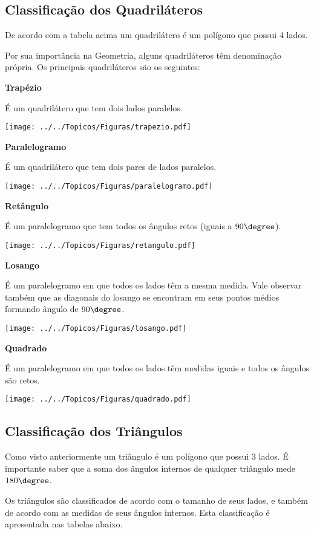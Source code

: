 \subsection{Classificação dos Quadriláteros}

De acordo com a tabela acima um quadrilátero é um polígono que possui 4 lados.

Por sua importância na Geometria, alguns quadriláteros têm denominação própria. Os principais quadriláteros são os seguintes:

\textbf{Trapézio}

É um quadrilátero que tem dois lados paralelos. 

\texttt{[image: ../../Topicos/Figuras/trapezio.pdf]}


\textbf{Paralelogramo}

É um quadrilátero que tem dois pares de lados paralelos.

\texttt{[image: ../../Topicos/Figuras/paralelogramo.pdf]}

\newpage
\textbf{Retângulo}

É um paralelogramo que tem todos os ângulos retos (iguais a $90\degree$).

\texttt{[image: ../../Topicos/Figuras/retangulo.pdf]}


\textbf{Losango}

É um paralelogramo em que todos os lados têm a mesma medida. Vale observar também que as diagonais do losango se encontram em seus pontos médios formando ângulo de $90\degree$.

\texttt{[image: ../../Topicos/Figuras/losango.pdf]}


\textbf{Quadrado}

É um paralelogramo em que todos os lados têm medidas iguais e todos os ângulos são retos.

\texttt{[image: ../../Topicos/Figuras/quadrado.pdf]}


\subsection{Classificação dos Triângulos}

Como visto anteriormente um triângulo é um polígono que possui 3 lados. É importante saber que a soma dos ângulos internos de qualquer triângulo mede $180\degree$.

Os triângulos são classificados de acordo com o tamanho de seus lados, e também de acordo com as medidas de seus ângulos internos. Esta classificação é apresentada nas tabelas abaixo.

